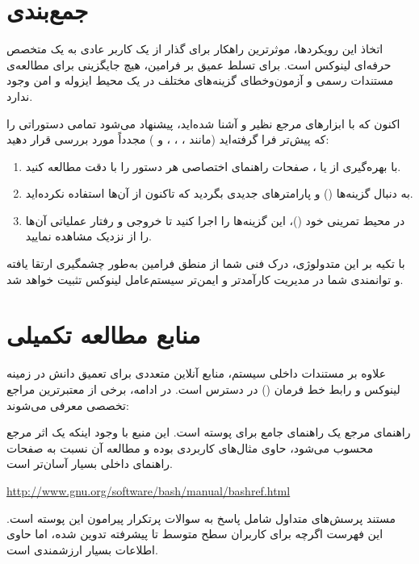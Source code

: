 \section{جمع‌بندی}

اتخاذ این رویکردها، موثرترین راهکار برای گذار از یک کاربر عادی به یک متخصص حرفه‌ای لینوکس است. برای تسلط عمیق بر فرامین، هیچ جایگزینی برای مطالعه‌ی مستندات رسمی و آزمون‌وخطای گزینه‌های مختلف در یک محیط ایزوله و امن وجود ندارد.

اکنون که با ابزارهای مرجع نظیر  و  آشنا شده‌اید، پیشنهاد می‌شود تمامی دستوراتی را که پیش‌تر فرا گرفته‌اید (مانند ، ، ،  و ) مجدداً مورد بررسی قرار دهید:

\begin{enumerate}
  \item با بهره‌گیری از  یا ، صفحات راهنمای اختصاصی هر دستور را با دقت مطالعه کنید.
  \item به دنبال گزینه‌ها () و پارامترهای جدیدی بگردید که تاکنون از آن‌ها استفاده نکرده‌اید.
  \item در محیط تمرینی خود ()، این گزینه‌ها را اجرا کنید تا خروجی و رفتار عملیاتی آن‌ها را از نزدیک مشاهده نمایید.
\end{enumerate}

با تکیه بر این متدولوژی، درک فنی شما از منطق فرامین به‌طور چشمگیری ارتقا یافته و توانمندی شما در مدیریت کارآمدتر و ایمن‌تر سیستم‌عامل لینوکس تثبیت خواهد شد.

\section{منابع مطالعه تکمیلی}

علاوه بر مستندات داخلی سیستم، منابع آنلاین متعددی برای تعمیق دانش در زمینه لینوکس و رابط خط فرمان () در دسترس است. در ادامه، برخی از معتبرترین مراجع تخصصی معرفی می‌شوند:

راهنمای مرجع  یک راهنمای جامع برای پوسته  است. این منبع با وجود اینکه یک اثر مرجع محسوب می‌شود، حاوی مثال‌های کاربردی بوده و مطالعه آن نسبت به صفحات راهنمای داخلی  بسیار آسان‌تر است.

\begin{latin}
\url{http://www.gnu.org/software/bash/manual/bashref.html}
\end{latin}

مستند پرسش‌های متداول  شامل پاسخ به سوالات پرتکرار پیرامون این پوسته است. این فهرست اگرچه برای کاربران سطح متوسط تا پیشرفته تدوین شده، اما حاوی اطلاعات بسیار ارزشمندی است.

